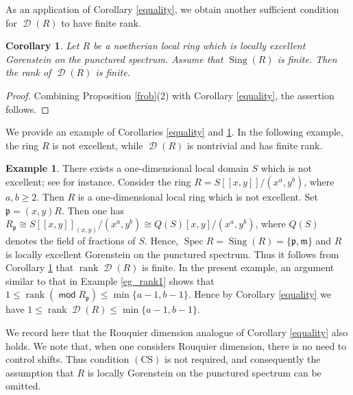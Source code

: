 \documentclass[10pt]{amsart}
\newtheorem{prop}[thm]{Proposition}
\newtheorem{cor}[thm]{Corollary}
\theoremstyle{definition}
\newtheorem{ex}[thm]{Example}
\theoremstyle{remark}
\numberwithin{equation}{thm}
\def\d{\operatorname{\mathscr{D}}}
\def\ge{\geqslant}
\def\le{\leqslant}
\def\m{\mathfrak{m}}
\def\mod{\operatorname{\mathsf{mod}}}
\def\p{\mathfrak{p}}
\def\rank{\operatorname{rank}}
\def\Sing{\operatorname{Sing}}
\def\Spec{\operatorname{Spec}}
\begin{document}
As an application of Corollary \ref{equality}, we obtain another sufficient condition for $\d(R)$ to have finite rank.
\begin{cor}\label{rankfin2}
Let $R$ be a noetherian local ring which is locally excellent Gorenstein on the punctured spectrum.
Assume that $\Sing(R)$ is finite.
Then the rank of $\d(R)$ is finite.
\end{cor}
\begin{proof}
Combining Proposition \ref{frob}(2) with Corollary \ref{equality}, the assertion follows.
\end{proof}
We provide an example of Corollaries \ref{equality} and \ref{rankfin2}.
In the following example, the ring $R$ is not excellent, while $\d(R)$ is nontrivial and has finite rank.
\begin{ex}\label{eg_notexc}
There exists a one-dimensional local domain $S$ which is not excellent; see \cite{A1935} for instance.
Consider the ring $R=S[\![x,y]\!]/(x^{a},y^{b})$, where $a,b\ge 2$.
Then $R$ is a one-dimensional local ring which is not excellent. 
Set $\p=(x,y)R$.
Then one has
$R_{\p}\cong S[\![x,y]\!]_{(x,y)}/(x^{a},y^{b})
\cong Q(S)[x,y]/(x^{a},y^{b})$, where $Q(S)$ denotes the field of fractions of $S$.
Hence, $\Spec R=\Sing(R)=\{\p,\m\}$ and $R$ is locally excellent Gorenstein on the punctured spectrum.
Thus it follows from Corollary \ref{rankfin2} that $\rank\d(R)$ is finite.
In the present example, an argument similar to that in Example \ref{eg_rank1} shows that $1\le\rank(\mod R_{\p})\le \min\{a-1,b-1\}$.
Hence by Corollary \ref{equality} we have $1\le\rank\d(R)\le\min\{a-1,b-1\}$.
\end{ex}
We record here that the Rouquier dimension analogue of Corollary \ref{equality} also holds. 
We note that, when one considers Rouquier dimension, there is no need to control shifts. 
Thus condition $(\mathrm{CS})$ is not required, and consequently the assumption that $R$ is locally Gorenstein on the punctured spectrum can be omitted. 
\end{document}
